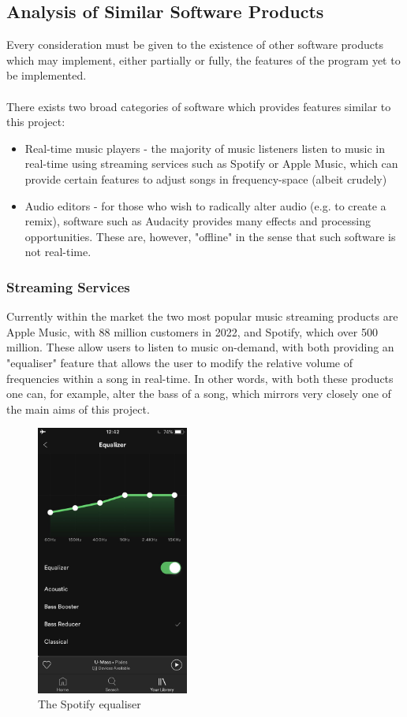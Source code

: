 \pagebreak
\subsection{Analysis of Similar Software Products}
Every consideration must be given to the existence of other software products which may implement, either partially or fully, the features of the program yet to be implemented.

\paragraph{}
There exists two broad categories of software which provides features similar to this project:
\begin{itemize}
	\item Real-time music players - the majority of music listeners listen to music in real-time using streaming services such as Spotify or Apple Music, which can provide certain features to adjust songs in frequency-space (albeit crudely)

	\item Audio editors - for those who wish to radically alter audio (e.g. to create a remix), software such as Audacity provides many effects and processing opportunities. These are, however, "offline" in the sense that such software is not real-time.
\end{itemize}

\subsubsection{Streaming Services}
Currently within the market the two most popular music streaming products are Apple Music, with 88 million customers in 2022, and Spotify, which over 500 million. These allow users to listen to music on-demand, with both providing an "equaliser" feature that allows the user to modify the relative volume of frequencies within a song in real-time. In other words, with both these products one can, for example, alter the bass of a song, which mirrors very closely one of the main aims of this project.

\begin{figure}[H]
	\caption{The Spotify equaliser}
	\begin{center}
		\includegraphics[width=5cm]{./spotify equaliser.jpg}
	\end{center}
\end{figure}

